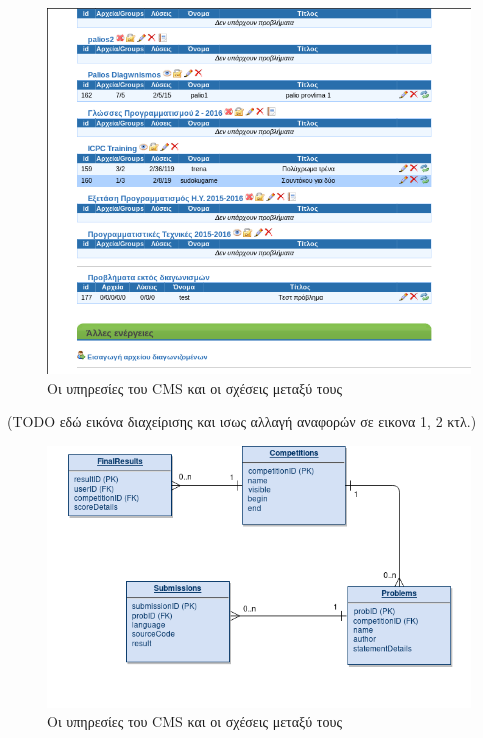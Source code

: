 \documentclass[diploma]{softlab-thesis}
\begin{document}
\bigskip

\begin{figure}
  \centering
  \includegraphics[scale=0.4,trim=4 4 4 4,clip]{Figures/beforesep.png}
  \caption[Η αρχιτεκτονική του CMS]{Οι υπηρεσίες του CMS και οι σχέσεις μεταξύ τους}
\end{figure}
(TODO εδώ εικόνα διαχείρισης και ισως αλλαγή αναφορών σε εικονα 1, 2 κτλ.)

\bigskip

\begin{figure}
  \centering
  \includegraphics[scale=0.4,trim=4 4 4 4,clip]{Figures/sepbefore.png}
  \caption[Η αρχιτεκτονική του CMS]{Οι υπηρεσίες του CMS και οι σχέσεις μεταξύ τους}
\end{figure}
\end{document}
